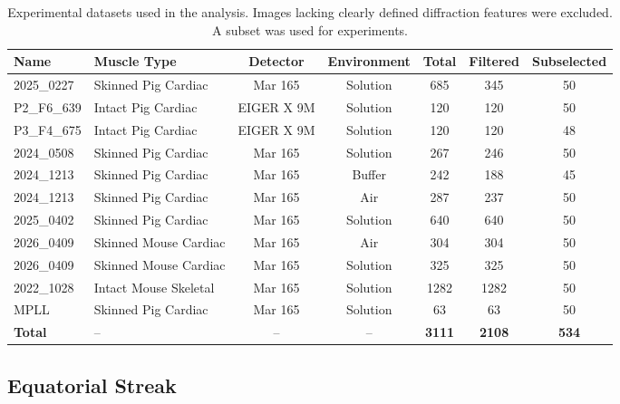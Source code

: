 \documentclass[iucr]{iucrjournals}
\begin{document}
\begin{table}[h]
\caption{Experimental datasets used in the analysis. Images lacking clearly defined diffraction features were excluded. A subset was used for experiments.}
\label{tab:datasets}
\centering
\small
\setlength{\tabcolsep}{4pt}
\renewcommand{\arraystretch}{1.0}
\begin{tabular}{@{}llccccc@{}}
\toprule
\textbf{Name} & \textbf{Muscle Type} & \textbf{Detector} & \textbf{Environment} & \textbf{Total} & \textbf{Filtered} & \textbf{Subselected} \\ \midrule
2025\_0227 & Skinned Pig Cardiac & Mar 165 & Solution & 685 & 345 & 50 \\
P2\_F6\_639 & Intact Pig Cardiac & EIGER X 9M & Solution & 120 & 120 & 50 \\
P3\_F4\_675 & Intact Pig Cardiac & EIGER X 9M & Solution & 120 & 120 & 48 \\
2024\_0508 & Skinned Pig Cardiac & Mar 165 & Solution & 267 & 246 & 50 \\
2024\_1213 & Skinned Pig Cardiac & Mar 165 & Buffer & 242 & 188 & 45 \\
2024\_1213 & Skinned Pig Cardiac & Mar 165 & Air & 287 & 237 & 50 \\
2025\_0402 & Skinned Pig Cardiac & Mar 165 & Solution & 640 & 640 & 50 \\
2026\_0409 & Skinned Mouse Cardiac & Mar 165 & Air & 304 & 304 & 50 \\
2026\_0409 & Skinned Mouse Cardiac & Mar 165 & Solution & 325 & 325 & 50 \\
2022\_1028 & Intact Mouse Skeletal & Mar 165 & Solution & 1282 & 1282 & 50 \\
MPLL & Skinned Pig Cardiac & Mar 165 & Solution & 63 & 63 & 50 \\ \midrule
\textbf{Total} & -- & -- & -- & \textbf{3111} & \textbf{2108} & \textbf{534} \\
\bottomrule
\end{tabular}
\end{table}


\subsection{Equatorial Streak}
\label{sec:equatorial_streak}
\end{document}
